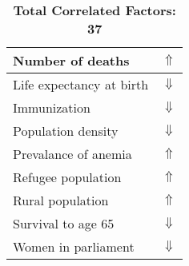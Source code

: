 \documentclass[12pt,notitlepage,oneside]{report}
\begin{document}
\begin{table}[!htb]
\begin{tabular}{|l|l|}
Number of deaths & $\Uparrow$\\ \hline
Life expectancy at birth & $\Downarrow$\\ \hline
Immunization & $\Downarrow$\\ \hline
Population density & $\Downarrow$\\ \hline
Prevalance of anemia & $\Uparrow$\\ \hline
Refugee population & $\Uparrow$\\ \hline
Rural population & $\Uparrow$\\ \hline
Survival to age 65 & $\Downarrow$\\ \hline
Women in parliament & $\Downarrow$\\ \hline
\end{tabular}
\caption*{\textbf{Total Correlated Factors: 37}}
\end{table}
\clearpage
\end{document}
